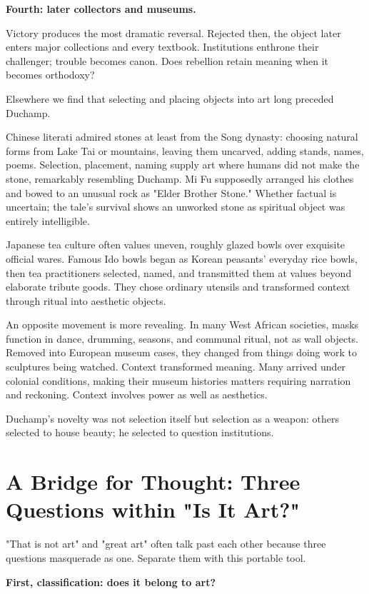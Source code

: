 \textbf{Fourth: later collectors and museums.}

Victory produces the most dramatic reversal. Rejected then, the object later enters major collections and every textbook. Institutions enthrone their challenger; trouble becomes canon. Does rebellion retain meaning when it becomes orthodoxy?

Elsewhere we find that selecting and placing objects into art long preceded Duchamp.

Chinese literati admired stones at least from the Song dynasty: choosing natural forms from Lake Tai or mountains, leaving them uncarved, adding stands, names, poems. Selection, placement, naming supply art where humans did not make the stone, remarkably resembling Duchamp. Mi Fu supposedly arranged his clothes and bowed to an unusual rock as "Elder Brother Stone." Whether factual is uncertain; the tale's survival shows an unworked stone as spiritual object was entirely intelligible.

Japanese tea culture often values uneven, roughly glazed bowls over exquisite official wares. Famous Ido bowls began as Korean peasants' everyday rice bowls, then tea practitioners selected, named, and transmitted them at values beyond elaborate tribute goods. They chose ordinary utensils and transformed context through ritual into aesthetic objects.

An opposite movement is more revealing. In many West African societies, masks function in dance, drumming, seasons, and communal ritual, not as wall objects. Removed into European museum cases, they changed from things doing work to sculptures being watched. Context transformed meaning. Many arrived under colonial conditions, making their museum histories matters requiring narration and reckoning. Context involves power as well as aesthetics.

Duchamp's novelty was not selection itself but selection as a weapon: others selected to house beauty; he selected to question institutions.

\section[Three Questions about Art]{A Bridge for Thought: Three Questions within "Is It Art?"}
"That is not art" and "great art" often talk past each other because three questions masquerade as one. Separate them with this portable tool.

\textbf{First, classification: does it belong to art?}

